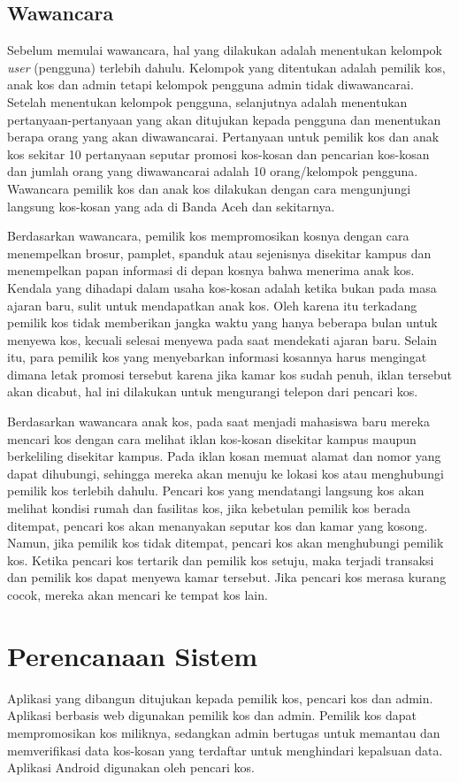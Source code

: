 	\subsection{Wawancara}
	Sebelum memulai wawancara, hal yang dilakukan adalah menentukan kelompok \textit{user} (pengguna) terlebih dahulu. Kelompok yang ditentukan adalah pemilik kos, anak kos dan admin tetapi kelompok pengguna admin tidak diwawancarai. Setelah menentukan kelompok pengguna, selanjutnya adalah menentukan pertanyaan-pertanyaan yang akan ditujukan kepada pengguna dan menentukan berapa orang yang akan diwawancarai. Pertanyaan untuk pemilik kos dan anak kos sekitar 10 pertanyaan seputar promosi kos-kosan dan pencarian kos-kosan dan jumlah orang yang diwawancarai adalah 10 orang/kelompok pengguna. Wawancara pemilik kos dan anak kos dilakukan dengan cara mengunjungi langsung kos-kosan yang ada di Banda Aceh dan sekitarnya. 
	
	Berdasarkan wawancara, pemilik kos mempromosikan kosnya dengan cara menempelkan brosur, pamplet, spanduk atau sejenisnya disekitar kampus dan menempelkan papan informasi di depan kosnya bahwa menerima anak kos. Kendala yang dihadapi dalam usaha kos-kosan adalah ketika bukan pada masa ajaran baru, sulit untuk mendapatkan anak kos. Oleh karena itu terkadang pemilik kos tidak memberikan jangka waktu yang hanya beberapa bulan untuk menyewa kos, kecuali selesai menyewa pada saat mendekati ajaran baru. Selain itu, para pemilik kos yang menyebarkan informasi kosannya harus mengingat dimana letak promosi tersebut karena jika kamar kos sudah penuh, iklan tersebut akan dicabut, hal ini dilakukan untuk mengurangi telepon dari pencari kos.
	
	Berdasarkan wawancara anak kos, pada saat menjadi mahasiswa baru mereka mencari kos dengan cara melihat iklan kos-kosan disekitar kampus maupun berkeliling disekitar kampus. Pada iklan kosan memuat alamat dan nomor yang dapat dihubungi, sehingga mereka akan menuju ke lokasi kos atau menghubungi pemilik kos terlebih dahulu. Pencari kos yang mendatangi langsung kos akan melihat kondisi rumah dan fasilitas kos, jika kebetulan pemilik kos berada ditempat, pencari kos akan menanyakan seputar kos dan kamar yang kosong. Namun, jika pemilik kos tidak ditempat, pencari kos akan menghubungi pemilik kos. Ketika pencari kos tertarik dan pemilik kos setuju, maka terjadi transaksi dan pemilik kos dapat menyewa kamar tersebut. Jika pencari kos merasa kurang cocok, mereka akan mencari ke tempat kos lain.
	
	\section{Perencanaan Sistem}
	Aplikasi yang dibangun ditujukan kepada pemilik kos, pencari kos dan admin. Aplikasi berbasis web digunakan pemilik kos dan admin. Pemilik kos dapat mempromosikan kos miliknya, sedangkan admin bertugas untuk memantau  dan memverifikasi data kos-kosan yang terdaftar untuk menghindari kepalsuan data. Aplikasi Android digunakan oleh pencari kos. 
	
